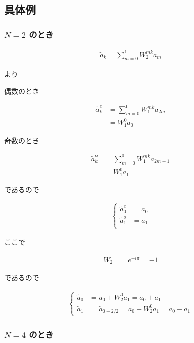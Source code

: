 \subsection{具体例}

\subsubsection{$N = 2$ のとき}

\begin{align}
    \tilde{a}_k = \sum_{m = 0}^1 W_2^{mk} a_m
\end{align}

より

偶数のとき

\begin{align*}
    \tilde{a}_k^{e} &= \sum_{m = 0}^0 W_1^{mk} a_{2m} \\
                    &= W_1^0 a_0
\end{align*}

奇数のとき

\begin{align*}
    \tilde{a}_k^{o} &= \sum_{m = 0}^0 W_1^{mk} a_{2m + 1} \\
                    &= W_1^0 a_1
\end{align*}

であるので

\begin{align}
    \begin{cases}
        \tilde{a}_0^{e} &= a_0 \\
        \tilde{a}_1^{o} &= a_1 \\
    \end{cases}
\end{align}

ここで

\begin{align*}
    W_2 &= e^{-i\pi} = -1
\end{align*}

であるので

\begin{align}
    \begin{cases}
        \tilde{a}_0 &= a_0 + W_2^0 a_1 = a_0 + a_1 \\
        \tilde{a}_1 &= \tilde{a}_{0 + 2/2} = a_0 - W_2^0 a_1 = a_0 - a_1
    \end{cases}
\end{align}

\subsubsection{$N = 4$ のとき}

